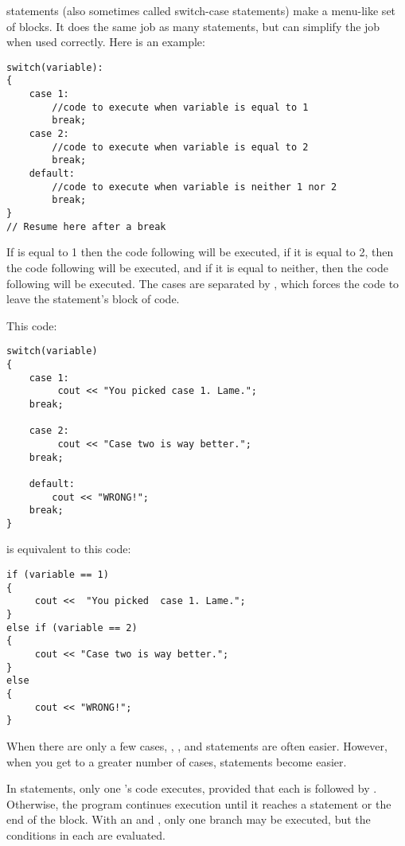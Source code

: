 
 statements (also sometimes called switch-case statements) make a menu-like set of blocks. 
It does the same job as many  statements, but can simplify the job when used correctly. 
Here is an example:

\begin{lstlisting}
switch(variable):
{
	case 1:
		//code to execute when variable is equal to 1
		break;
	case 2:
		//code to execute when variable is equal to 2
		break;
	default:
		//code to execute when variable is neither 1 nor 2
		break;
}
// Resume here after a break
\end{lstlisting}

If  is equal to 1 then the code following  will be executed, if it is equal to 2, then the code following  will be executed, and if it is equal to neither, then the code following  will be executed. 
The cases are separated by , which forces the code to leave the  statement's block of code.

This code:
\begin{lstlisting}
switch(variable)
{
    case 1:
         cout << "You picked case 1. Lame.";
    break;

    case 2:
         cout << "Case two is way better.";
    break;

    default:
        cout << "WRONG!";
    break;
}
\end{lstlisting}

\noindent is equivalent to this code:

\begin{lstlisting}
if (variable == 1)
{
     cout <<  "You picked  case 1. Lame.";
}
else if (variable == 2)
{
     cout << "Case two is way better.";
}
else
{
     cout << "WRONG!";
}
\end{lstlisting}

When there are only a few cases, , , and  statements are often easier. 
However, when you get to a greater number of cases,  statements become easier.

In  statements, only one 's code executes, provided that each  is followed by . 
Otherwise, the program continues execution until it reaches a  statement or the end of the  block. 
With an  and , only one branch may be executed, but the conditions in each  are evaluated.

